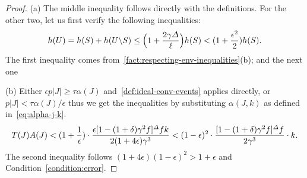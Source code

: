 \begin{proof}
    (a) The middle inequality follows directly with the definitions.
    For the other two, let us first verify the following inequalities:
    \[ h(U) = h(S) + h(U \backslash S) \le \Big(1 + \frac{2\gamma \varDelta}{\ell} \Big) h(S) < (1 + \frac{\epsilon^2}{2}) h(S). \]
    The first inequality comes from~\cref{fact:respecting-env-inequalities}(b); and the next one

    (b) Either $\epsilon p|J| \ge \tau \alpha(J)$ and~\cref{def:ideal-conv-events} applies directly, or $p|J| < \tau \alpha(J) / \epsilon$ thus we get the inequalities by substituting $\alpha(J, k)$ as defined in~\cref{eq:alpha-j-k}.
    \[ T(J)A(J) <  (1 + \frac{1}{\epsilon}) \cdot \frac{\epsilon [1 - (1 + \delta) \gamma^2 f]^\varDelta f k}{2(1 + 4\epsilon) \gamma^3} < (1 - \epsilon)^2 \cdot \frac{[1 - (1 + \delta) \gamma^2 f]^{\varDelta} f}{2  \gamma^3} \cdot k. \]
    The second inequality follows $(1 + 4\epsilon)(1 - \epsilon)^2 > 1 + \epsilon$ and Condition~\eqref{condition:error}.
\end{proof}